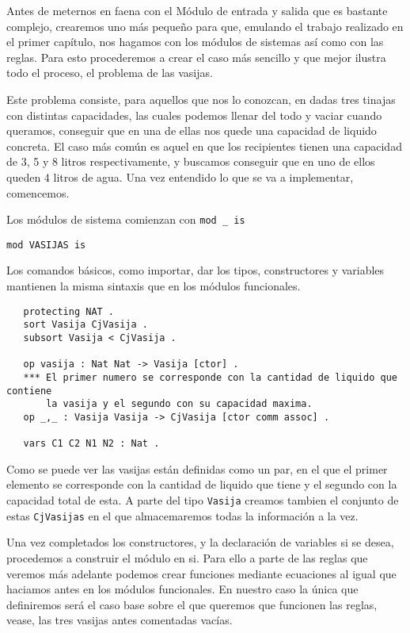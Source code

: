
Antes de meternos en faena con el Módulo de entrada y salida que es bastante complejo, crearemos uno más pequeño para que, emulando el trabajo realizado en el primer capítulo, nos hagamos con los módulos de sistemas así como con las reglas. Para esto procederemos a crear el caso más sencillo y que mejor ilustra todo el proceso, el problema de las vasijas. \par

Este problema consiste, para aquellos que nos lo conozcan, en dadas tres tinajas con distintas capacidades, las cuales podemos llenar del todo y vaciar cuando queramos, conseguir que en una de ellas nos quede una capacidad de liquido concreta. El caso más común es aquel en que los recipientes tienen una capacidad de 3, 5 y 8 litros respectivamente, y buscamos conseguir que en uno de ellos queden 4 litros de agua. Una vez entendido lo que se va a implementar, comencemos. \par

Los módulos de sistema comienzan con \verb"mod _ is"

{\codesize
\begin{verbatim}
mod VASIJAS is
\end{verbatim}
}

Los comandos básicos, como importar, dar los tipos, constructores y variables mantienen la misma sintaxis que en los módulos funcionales. \par

{\codesize
\begin{verbatim}
   protecting NAT .
   sort Vasija CjVasija .
   subsort Vasija < CjVasija .

   op vasija : Nat Nat -> Vasija [ctor] .
   *** El primer numero se corresponde con la cantidad de liquido que contiene 
       la vasija y el segundo con su capacidad maxima.
   op _,_ : Vasija Vasija -> CjVasija [ctor comm assoc] .

   vars C1 C2 N1 N2 : Nat .
\end{verbatim}
}
Como se puede ver las vasijas están definidas como un par, en el que el primer elemento se corresponde con la cantidad de liquido que tiene y el segundo con la capacidad total de esta. A parte del tipo \texttt{Vasija} creamos tambien el conjunto de estas \texttt{CjVasijas} en el que almacemaremos todas la información a la vez.\par 

Una vez completados los constructores, y la declaración de variables si se desea, procedemos a construir el módulo en si. Para ello a parte de las reglas que veremos más adelante podemos crear funciones mediante ecuaciones al igual que haciamos antes en los módulos funcionales. En nuestro caso la única que definiremos será el caso base sobre el que queremos que funcionen las reglas, vease, las tres vasijas antes comentadas vacías.\par

